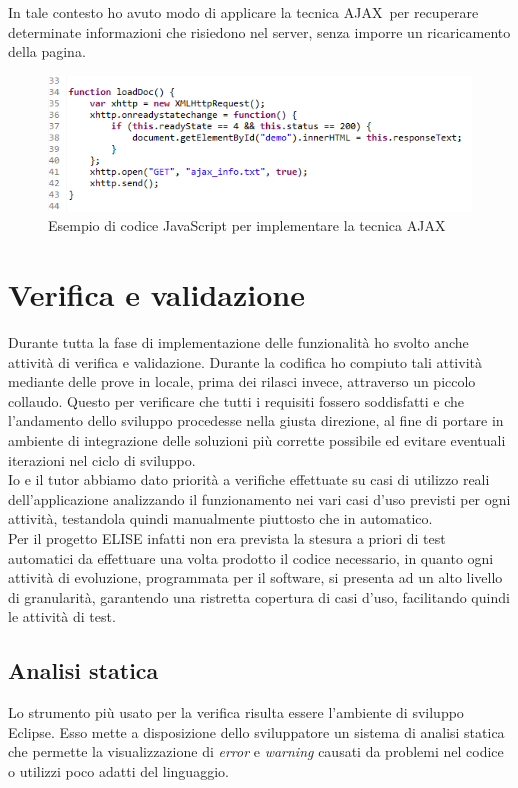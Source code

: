 	In tale contesto ho avuto modo di applicare la tecnica AJAX\glossario\ per recuperare determinate informazioni che risiedono nel server, senza imporre un ricaricamento della pagina. 
	
	\begin{figure}[H]
		\centering
	   	\includegraphics[width=1\textwidth]{immagini/codice_AJAX}
	   	\caption{Esempio di codice JavaScript per implementare la tecnica AJAX}
	\end{figure}

\section{Verifica e validazione}

Durante tutta la fase di implementazione delle funzionalità ho svolto anche attività di verifica e validazione. Durante la codifica ho compiuto tali attività mediante delle prove in locale, prima dei rilasci invece, attraverso un piccolo collaudo. Questo per verificare che tutti i requisiti fossero soddisfatti e che l'andamento dello sviluppo procedesse nella giusta direzione, al fine di portare in ambiente di integrazione delle soluzioni più corrette possibile ed evitare eventuali iterazioni nel ciclo di sviluppo.\\

	Io e il tutor abbiamo dato priorità a verifiche effettuate su casi di utilizzo reali dell'applicazione analizzando il funzionamento nei vari casi d'uso previsti per ogni attività, testandola quindi manualmente piuttosto che in automatico.\\
	
	Per il progetto ELISE infatti non era prevista la stesura a priori di test automatici da effettuare una volta prodotto il codice necessario, in quanto ogni attività di evoluzione, programmata per il software, si presenta ad un alto livello di granularità, garantendo una ristretta copertura di casi d'uso, facilitando quindi le attività di test.

	\subsection{Analisi statica}
	Lo strumento più usato per la verifica risulta essere l'ambiente di sviluppo Eclipse. Esso mette a disposizione dello sviluppatore un sistema di analisi statica che permette la visualizzazione di \textit{error} e \textit{warning} causati da problemi nel codice o utilizzi poco adatti del linguaggio.\\
	
